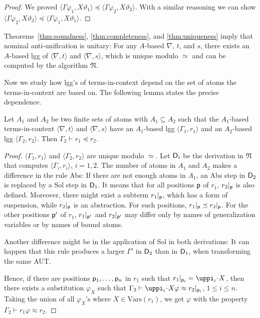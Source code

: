 \documentclass{llncs}
\newcommand{\vars}{\mathrm{Vars}}
\newcommand{\frN}{\mathfrak N}
\newcommand{\permap}{{\mkern 1mu\cdot \mkern 1mu}}
\newcommand\pos{{\sf p}}
\newcommand\ppi{\uppi}
\newcommand{\np}[2]{\langle #1, \allowbreak #2\rangle}
\begin{document}
\begin{proof}
We proved $\np{\Gamma\varphi_1}{X\vartheta_1} \preceq \np{\Gamma\varphi_2}{X\vartheta_2}$. With a similar reasoning we can show $\np{\Gamma\varphi_2}{X\vartheta_2} \preceq \np{\Gamma\varphi_1}{X\vartheta_1}$.
\end{proof}

Theorems~\ref{thm:soundness}, \ref{thm:completeness}, and \ref{thm:uniqueness} imply that nominal anti-unification is unitary: For any $A$-based $\nabla$, $t$, and $s$, there exists an $A$-based lgg of $\np{\nabla}{t}$ and $\np{\nabla}{s}$, which is unique modulo $\simeq$ and can be computed by the algorithm $\frN$. 

Now we study how lgg's of terms-in-context depend on the set of atoms the terms-in-context are based on. The following lemma states the precise dependence.

 \begin{lemma}
    \label{lemma:subset:gen}
    Let $A_1$ and $A_2$ be two finite sets of atoms with $A_1\subseteq A_2$
    such that the $A_1$-based terms-in-context $\np{\nabla}{t}$ and
    $\np{\nabla}{s}$ have an $A_1$-based lgg $\np{\Gamma_1}{r_1}$ and
    an $A_2$-based lgg $\np{\Gamma_2}{r_2}$. Then $\Gamma_2\vdash r_1\preceq r_2$.
  \end{lemma}


\begin{proof}
$\np{\Gamma_1}{r_1}$ and $\np{\Gamma_2}{r_2}$ are unique modulo $\simeq$. Let ${\sf D}_i$  be the derivation in $\frN$ that computes $\np{\Gamma_i}{r_i}$, $i=1,2$. The number of atoms in $A_1$ and $A_2$ makes a difference in the rule \textsf{Abs}: If there are not enough atoms in $A_1$, an \textsf{Abs} step in ${\sf D}_2$ is replaced by a \textsf{Sol} step in ${\sf D}_1$. It means that for all positions $\pos$ of $r_1$, $r_2|_\pos$ is also defined. Moreover, there might exist a subterm $r_1|_\pos$, which has a form of suspension, while $r_2|_\pos$ is an abstraction. For such positions, $r_1|_\pos\preceq r_2|_\pos$. For the other positions $\pos'$ of $r_1$, $r_1|_{\pos'}$ and $r_2|_{\pos'}$ may differ only by names of generalization variables or by names of bound atoms.

Another difference might be in the application of \textsf{Sol} in both derivations: It can happen that this rule produces a larger $\Gamma'$ in ${\sf D}_2$ than in ${\sf D}_1$, when transforming the same AUT. 

Hence, if there are positions $\pos_1,\ldots,\pos_n$ in $r_1$ such that $r_1|_{\pos_i}=\ppi_i\permap X$, then there exists a substitution $\varphi_X$ such that $\Gamma_2\vdash \ppi_i \permap X\varphi \approx r_2|_{\pos_i}$, $1\le i \le n $. Taking the union of all $\varphi_X$'s where $X\in \vars(r_1)$, we get $\varphi$ with the property $\Gamma_2 \vdash r_1\varphi \approx r_2$. 
\end{proof}
\end{document}
